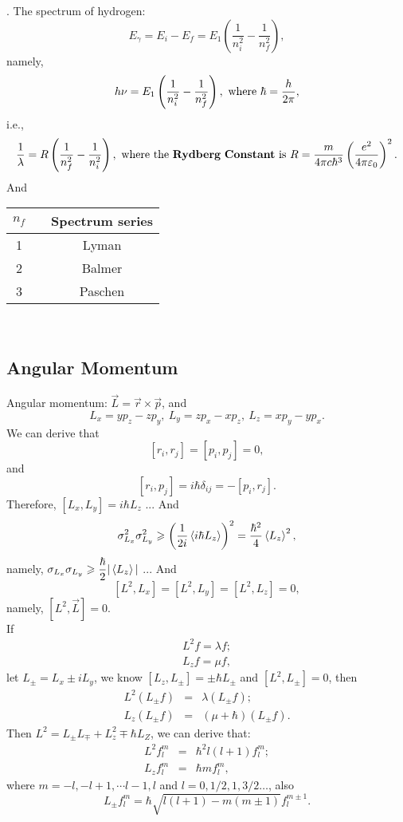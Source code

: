 \documentclass[12pt, 
]{article}
\begin{document}
. The spectrum of hydrogen:
\[
	E_\gamma=E_i-E_f=E_1\left(\frac{1}{n_i^2}-\frac{1}{n_f^2}\right),
\]
namely,
\[
	h\nu=E_1\left(\frac{1}{n_i^2}-\frac{1}{n_f^2}\right), ~{\rm where}~\hbar=\frac{h}{2\pi},
\]
i.e.,
\[
	\frac{1}{\lambda}=R\left(\frac{1}{n_f^2}-\frac{1}{n_i^2}\right),~{\rm where~the~{\bf Rydberg~Constant}~is}~R=\frac{m}{4\pi c\hbar^3}\left(\frac{e^2}{4\pi\varepsilon_0}\right)^2.
\]
And 
\begin{table}[h]
	\centering
	\begin{tabular}{ccc}
	\hline\hline
		$n_f$&&Spectrum series\\
	\hline
		1&&Lyman\\
		2&&Balmer\\
		3&&Paschen\\
	\hline\hline
	\end{tabular}
\end{table}
~\\

\subsection{Angular Momentum}
Angular momentum: $\vec{L}=\vec{r}\times\vec{p}$, and 
\[
	L_x=yp_z-zp_y,~L_y=zp_x-xp_z,~L_z=xp_y-yp_x.
\]
We can derive that
\[
	[r_i,r_j]=[p_i,p_j]=0,
\]
and \[
	[r_i, p_j]=i\hbar\delta_{ij}=-[p_i,r_j].	
\]
Therefore, $[L_x, L_y]=i\hbar L_z$ ...
And
\[
	\sigma_{L_x}^2\sigma_{L_y}^2\geqslant\left(\frac{1}{2i}\braket{i\hbar L_z}\right)^2=\frac{\hbar^2}{4}\braket{L_z}^2,
\]
namely, $\sigma_{L_x}\sigma_{L_y}\geqslant\dfrac{\hbar}{2}|\braket{L_z}|$ ...
And \[
	[L^2,L_x]=[L^2,L_y]=[L^2,L_z]=0,
\]
namely, $[L^2,\vec{L}]=0$.\\
If 
\begin{eqnarray*}
	L^2f=\lambda f;\\
	L_zf=\mu f,
\end{eqnarray*}
let $L_\pm=L_x\pm iL_y$, we know $[L_z,L_\pm]=\pm\hbar L_\pm$ and $[L^2, L_\pm]=0$, then
\begin{eqnarray*}
	L^2(L_\pm f)&=&\lambda(L_\pm f);\\
	L_z(L_\pm f)&=&(\mu+\hbar)(L_\pm f).
\end{eqnarray*}
Then $L^2=L_\pm L_\mp +L_z^2\mp\hbar L_Z$, we can derive that:
\begin{eqnarray*}
	L^2f_l^m&=&\hbar^2l(l+1)f_l^m;\\
	L_zf_l^m&=&\hbar mf_l^m,
\end{eqnarray*}
where $m=-l, -l+1,\cdots l-1,l$ and $l=0,1/2,1,3/2\dots$, also
\begin{equation}\label{eq:22}
	L_\pm f_l^m=\hbar\sqrt{l(l+1)-m(m\pm1)}f_l^{m\pm 1}.
\end{equation}
\end{document}
